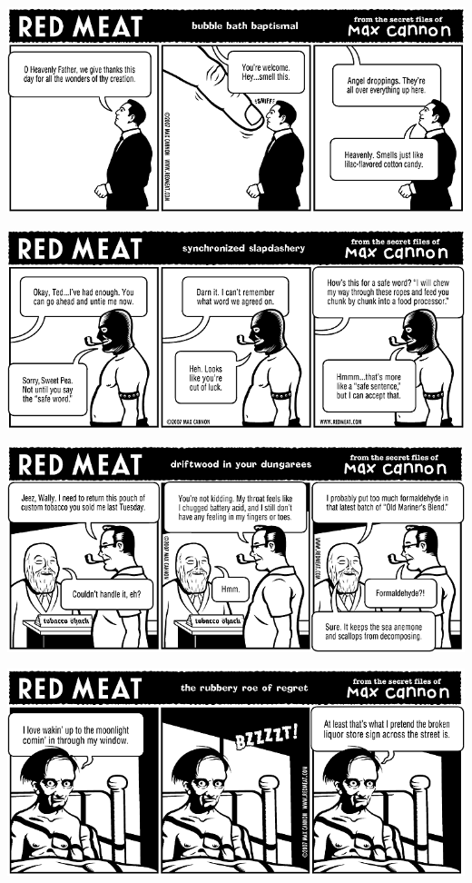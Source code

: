\documentclass[a4paper,twoside,11pt]{article}
\begin{document}
\includegraphics[width=\textwidth]{redmeat_2007-05-08.png}



\includegraphics[width=\textwidth]{redmeat_2007-05-15.png}



\includegraphics[width=\textwidth]{redmeat_2007-05-22.png}



\includegraphics[width=\textwidth]{redmeat_2007-05-29.png}
\end{document}
